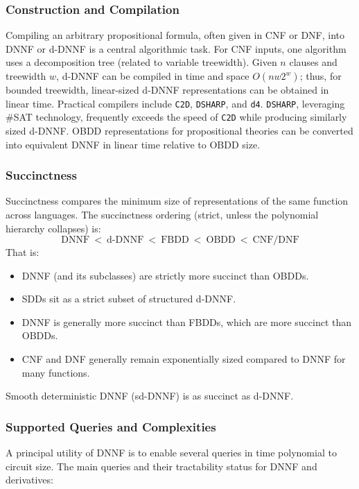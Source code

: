 \subsubsection{Construction and Compilation}
Compiling an arbitrary propositional formula, often given in CNF or DNF, into DNNF or d-DNNF is a central algorithmic task. For CNF inputs, one algorithm uses a decomposition tree (related to variable treewidth). Given $n$ clauses and treewidth $w$, d-DNNF can be compiled in time and space $O(n w 2^w)$; thus, for bounded treewidth, linear-sized d-DNNF representations can be obtained in linear time. Practical compilers include \texttt{C2D}, \texttt{DSHARP}, and \texttt{d4}. \texttt{DSHARP}, leveraging \#SAT technology, frequently exceeds the speed of \texttt{C2D} while producing similarly sized d-DNNF. OBDD representations for propositional theories can be converted into equivalent DNNF in linear time relative to OBDD size.

\subsubsection{Succinctness}
Succinctness compares the minimum size of representations of the same function across languages. The succinctness ordering (strict, unless the polynomial hierarchy collapses) is:
\[
\text{DNNF} ~<~ \text{d-DNNF} ~<~ \text{FBDD} ~<~ \text{OBDD} ~<~ \text{CNF}/\text{DNF}
\]
That is:
\begin{itemize}
    \item DNNF (and its subclasses) are strictly more succinct than OBDDs.
    \item SDDs sit as a strict subset of structured d-DNNF.
    \item DNNF is generally more succinct than FBDDs, which are more succinct than OBDDs.
    \item CNF and DNF generally remain exponentially sized compared to DNNF for many functions.
\end{itemize}
Smooth deterministic DNNF (sd-DNNF) is as succinct as d-DNNF.

\subsubsection{Supported Queries and Complexities}
A principal utility of DNNF is to enable several queries in time polynomial to circuit size. The main queries and their tractability status for DNNF and derivatives:

